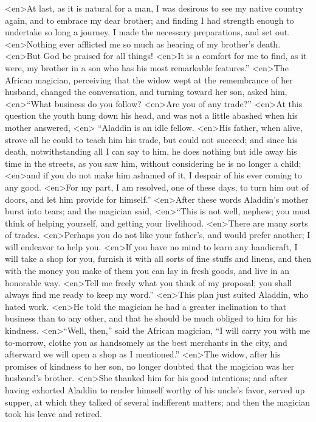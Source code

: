 <en>At last, as it is natural for a man, I was desirous to see my native country again, and to embrace my dear brother; and finding I had strength enough to undertake so long a journey, I made the necessary preparations, and set out.
<en>Nothing ever afflicted me so much as hearing of my brother’s death.
<en>But God be praised for all things!
<en>It is a comfort for me to find, as it were, my brother in a son who has his most remarkable features.”
<en>The African magician, perceiving that the widow wept at the remembrance of her husband, changed the conversation, and turning toward her son, asked him, 
<en>“What business do you follow?
<en>Are you of any trade?”
<en>At this question the youth hung down his head, and was not a little abashed when his mother answered,
<en> “Aladdin is an idle fellow.
<en>His father, when alive, strove all he could to teach him his trade, but could not succeed; and since his death, notwithstanding all I can say to him, he does nothing but idle away his time in the streets, as you saw him, without considering he is no longer a child; 
<en>and if you do not make him ashamed of it, I despair of his ever coming to any good.
<en>For my part, I am resolved, one of these days, to turn him out of doors, and let him provide for himself.”
<en>After these words Aladdin’s mother burst into tears; and the magician said, 
<en>“This is not well, nephew; you must think of helping yourself, and getting your livelihood.
<en>There are many sorts of trades.
<en>Perhaps you do not like your father’s, and would prefer another; I will endeavor to help you.
<en>If you have no mind to learn any handicraft, I will take a shop for you, furnish it with all sorts of fine stuffs and linens, and then with the money you make of them you can lay in fresh goods, and live in an honorable way.
<en>Tell me freely what you think of my proposal; you shall always find me ready to keep my word.”
<en>This plan just suited Aladdin, who hated work.
<en>He told the magician he had a greater inclination to that business than to any other, and that he should be much obliged to him for his kindness.
<en>“Well, then,” said the African magician, “I will carry you with me to-morrow, clothe you as handsomely as the best merchants in the city, and afterward we will open a shop as I mentioned.”
<en>The widow, after his promises of kindness to her son, no longer doubted that the magician was her husband’s brother.
<en>She thanked him for his good intentions; and after having exhorted Aladdin to render himself worthy of his uncle’s favor, served up supper, at which they talked of several indifferent matters; and then the magician took his leave and retired.
